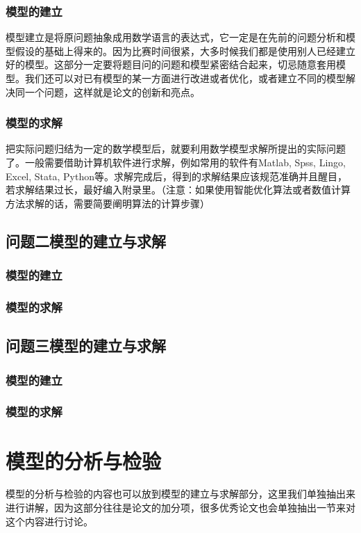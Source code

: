 \documentclass[a4paper,10.5pt]{ctexart}
\begin{document}
\subsubsection{模型的建立}
模型建立是将原问题抽象成用数学语言的表达式，它一定是在先前的问题分析和模型假设的基础上得来的。因为比赛时间很紧，大多时候我们都是使用别人已经建立好的模型。这部分一定要将题目问的问题和模型紧密结合起来，切忌随意套用模型。我们还可以对已有模型的某一方面进行改进或者优化，或者建立不同的模型解决同一个问题，这样就是论文的创新和亮点。
\subsubsection{模型的求解}
把实际问题归结为一定的数学模型后，就要利用数学模型求解所提出的实际问题了。一般需要借助计算机软件进行求解，例如常用的软件有Matlab, Spss, Lingo, Excel, Stata, Python等。求解完成后，得到的求解结果应该规范准确并且醒目，若求解结果过长，最好编入附录里。（注意：如果使用智能优化算法或者数值计算方法求解的话，需要简要阐明算法的计算步骤）
\subsection{问题二模型的建立与求解}
\subsubsection{模型的建立}
\subsubsection{模型的求解}\subsection{问题三模型的建立与求解}
\subsubsection{模型的建立}
\subsubsection{模型的求解}

\section{模型的分析与检验}
模型的分析与检验的内容也可以放到模型的建立与求解部分，这里我们单独抽出来进行讲解，因为这部分往往是论文的加分项，很多优秀论文也会单独抽出一节来对这个内容进行讨论。\cite{article1}
\end{document}
